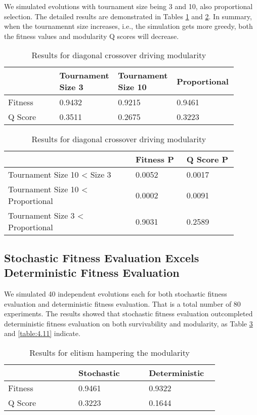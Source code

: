 We simulated evolutions with tournament size being 3 and 10, also proportional selection. The detailed results are demonstrated in Tables \ref{table:4.6} and \ref{table:4.7}. In summary, when the tournamennt size increases, i.e., the simulation gets more greedy, both the fitness values and modularity Q scores will decrease. 

\begin{table}[h]
	\centering
	\caption{Results for diagonal crossover driving modularity}
	\label{table:4.6}
	\begin{tabular}{| p{0.225\linewidth}  | p{0.225\linewidth}  | p{0.225\linewidth}  | p{0.225\linewidth}  |} 
		\hline
		& Tournament Size 3 & Tournament Size 10 & Proportional \\
		\hline
		Fitness & 0.9432 & 0.9215 & 0.9461 \\ 
		\hline
		Q Score & 0.3511 & 0.2675 & 0.3223 \\
		\hline
	\end{tabular}
\end{table}

\begin{table}[h]
	\centering
	\caption{Results for diagonal crossover driving modularity}
	\label{table:4.7}
	\begin{tabular}{| p{0.5\linewidth}  | p{0.2\linewidth}  | p{0.2\linewidth}  |} 
		\hline
		& Fitness P & Q Score P \\
		\hline
		Tournament Size 10 < Size 3 & 0.0052 & 0.0017 \\ 
		\hline
		Tournament Size 10 < Proportional & 0.0002 & 0.0091 \\
		\hline
		Tournament Size 3 < Proportional & 0.9031 & 0.2589 \\
		\hline
	\end{tabular}
\end{table}

\subsection{Stochastic Fitness Evaluation Excels Deterministic Fitness Evaluation}
We simulated 40 independent evolutions each for both stochastic fitness evaluation and deterministic fitness evaluation. That is a total number of 80 experiments. The results showed that stochastic fitness evaluation outcompleted deterministic fitness evaluation on both survivability and modularity, as Table \ref{table:4.10} and \ref{table:4.11} indicate. 

\begin{table}[h]
	\centering
	\caption{Results for elitism hampering the modularity}
	\label{table:4.10}
	\begin{tabular}{| p{0.3\linewidth}  | p{0.3\linewidth}  | p{0.3\linewidth} |} 
		\hline
		& Stochastic & Deterministic \\
		\hline
		Fitness & 0.9461 & 0.9322 \\ 
		\hline
		Q Score & 0.3223 & 0.1644 \\
		\hline
	\end{tabular}
\end{table}

